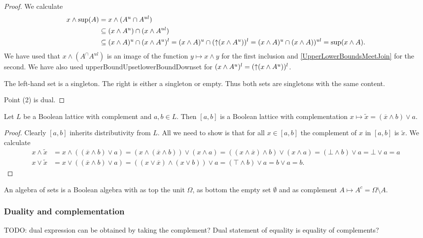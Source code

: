 \begin{proof}
We calculate
\begin{align*}
x\wedge \sup(A) &= x\wedge (A^u\cap A^{ul}) \\
&\subseteq (x\wedge A^u)\cap (x\wedge A^{ul}) \\
&\subseteq (x\wedge A)^u\cap (x\wedge A^{u})^l = (x\wedge A)^u\cap (\mathop{\uparrow}(x\wedge A^{u}))^l = (x\wedge A)^u\cap (x\wedge A))^{ul} = \sup(x\wedge A).
\end{align*}
We have used that $x\wedge (A^\cap A^{ul})$ is an image of the function $y\mapsto x\wedge y$ for the first inclusion and \ref{UpperLowerBoundsMeetJoin} for the second. We have also used {upperBoundUpsetlowerBoundDownset} for $(x\wedge A^{u})^l = (\mathop{\uparrow}(x\wedge A^{u}))^l$.

The left-hand set is a singleton. The right is either a singleton or empty. Thus both sets are singletons with the same content.

Point (2) is dual.
\end{proof}

\begin{proposition}
Let $L$ be a Boolean lattice with complement and $a,b\in L$. Then $[a,b]$ is a Boolean lattice with complementation $x\mapsto \widetilde{x} = (\overline{x} \wedge b)\vee a$. 
\end{proposition}
\begin{proof}
Clearly $[a,b]$ inherits distributivity from $L$. All we need to show is that for all $x\in [a,b]$ the complement of $x$ in $[a,b]$ is $\widetilde{x}$. We calculate
\begin{align*}
x \wedge \widetilde{x} &= x\wedge ((\overline{x} \wedge b)\vee a) = (x\wedge(\overline{x} \wedge b))\vee (x\wedge a) = (( x\wedge \overline{x}) \wedge b)\vee (x\wedge a) = (\bot \wedge b)\vee a = \bot \vee a = a \\
x \vee \widetilde{x} &= x\vee ((\overline{x} \wedge b)\vee a) = ((x\vee \overline{x}) \wedge (x\vee b))\vee a = (\top \wedge b) \vee a = b\vee a = b.
\end{align*}
\end{proof}

\begin{proposition}
An algebra of sets is a Boolean algebra with as top the unit $\Omega$, as bottom the empty set $\emptyset$ and as complement $A\mapsto A^c = \Omega\setminus A$.
\end{proposition}

\subsubsection{Duality and complementation}
TODO: dual expression can be obtained by taking the complement? Dual statement of equality is equality of complements?

